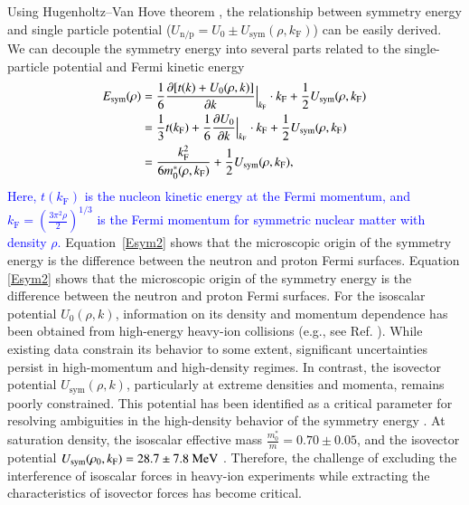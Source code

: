 \documentclass[twocolumn,twoside,showpacs,showkeys,preprintnumbers,superscriptaddress,amsmath,amssymb,prc,nofootinbib,a4paper]{revtex4}
\begin{document}
Using Hugenholtz–Van Hove theorem \cite{Hugenholtz:1958zz}, the relationship between symmetry energy and single particle potential ($U_{\mathrm{n/p}} = U_0 \pm U_{\mathrm{sym}}(\rho, k_{\mathrm{F}})$) can be easily derived. We can decouple the symmetry energy into several parts related to the single-particle potential and Fermi kinetic energy \cite{PhysRevC.82.054607} 
\begin{align}\label{Esym2}
E_{\rm sym}(\rho) &= \frac{1}{6} \frac{\partial
[t(k)+U_0(\rho,k)]}{\partial k}\Big|_{k_{\rm F}} \cdot k_{\rm F} + \frac{1}{2}
U_{\rm sym}(\rho,k_{\rm F})\nonumber \\ 
&=\frac{1}{3} t(k_{\rm F}) + \frac{1}{6}
\frac{\partial U_0}{\partial k}\Big|_{k_{\rm F}}\cdot k_{\rm F} +
\frac{1}{2}U_{\rm sym}(\rho,k_{\rm F})  \\
&= \frac{k_{\rm F}^2}{6m^*_0 (\rho,k_{\rm F})} + \frac{1}{2} U_{\rm sym}(\rho,k_{\rm F}), \nonumber
\end{align}
\textcolor{blue}{Here, $t(k_{\mathrm{F}})$ is the nucleon kinetic energy at the Fermi momentum, and $k_{\mathrm{F}} = \left( \frac{3\pi^2\rho}{2} \right)^{1/3}$ is the Fermi momentum for symmetric nuclear matter with density $\rho$.} Equation~\ref{Esym2} shows that the microscopic origin of the symmetry energy is the difference between the neutron and proton Fermi surfaces. Equation \ref{Esym2} shows that the microscopic origin of the symmetry energy is the difference between the neutron and proton Fermi surfaces. For the isoscalar potential $U_0(\rho, k)$, information on its density and momentum dependence has been obtained from high-energy heavy-ion collisions (e.g., see Ref. \cite{danielewicz2002determination}). While existing data constrain its behavior to some extent, significant uncertainties persist in high-momentum and high-density regimes. In contrast, the isovector potential $U_{\mathrm{sym}}(\rho, k)$, particularly at extreme densities and momenta, remains poorly constrained. This potential has been identified as a critical parameter for resolving ambiguities in the high-density behavior of the symmetry energy \cite{xu2011analytical,chen2012single,li2008recent}. At saturation density, the isoscalar effective mass $\frac{m_0^*}{m} = 0.70\pm0.05$, and the isovector potential $U_{\rm sym}(\rho_0,k_{\rm F})=28.7 \pm 7.8~\mathrm{MeV}$ \cite{li2013constraining,li2015neutron}. Therefore, the challenge of excluding the interference of isoscalar forces in heavy-ion experiments while extracting the characteristics of isovector forces has become critical.
  
\end{document}
